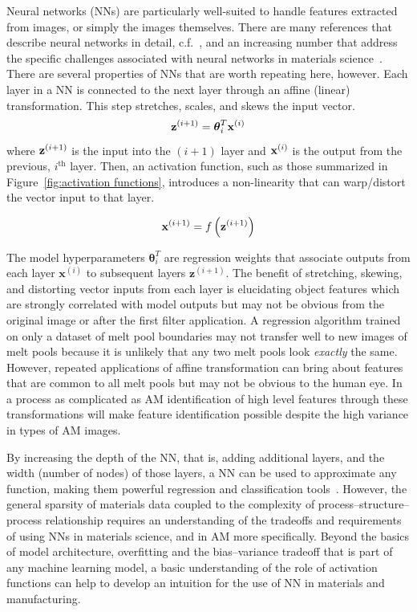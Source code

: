 Neural networks (NNs) are particularly well-suited to handle features extracted from images, or simply the images themselves. There are many references that describe neural networks in detail, c.f.~\cite{Hastie2009}, and an increasing number that address the specific challenges associated with neural networks in materials science~\cite{Bhadeshia2009}. There are several properties of NNs that are worth repeating here, however. Each layer in a NN is connected to the next layer through an affine (linear) transformation. This step stretches, scales, and skews the input vector.
\begin{equation}
	{\bold z}^{(i+1)} = \boldsymbol \theta_i^T {\bold x}^{(i)}
\end{equation}
where ${\bold z}^{(i+1)}$ is the input into the $(i+1)$ layer and ${\bold x}^{(i)}$ is the output from the previous, $i^\textrm{th}$ layer. Then, an activation function, such as those summarized in Figure~\ref{fig:activation functions}, introduces a non-linearity that can warp/distort the vector input to that layer. 

\begin{equation}
	{\bold x}^{(i+1)} = f \left( {\bold z}^{(i+1)} \right)
\end{equation}

The model hyperparameters $\mathbf{\theta}_i^T$ are regression weights that associate outputs from each layer $\mathbf{x}^{(i)}$ to subsequent layers $\mathbf{z}^{(i + 1)}$. The benefit of stretching, skewing, and distorting vector inputs from each layer is elucidating object features which are strongly correlated with model outputs but may not be obvious from the original image or after the first filter application. A regression algorithm trained on only a dataset of melt pool boundaries may not transfer well to new images of melt pools because it is unlikely that any two melt pools look \textit{exactly} the same. However, repeated applications of affine transformation can bring about features that are common to all melt pools but may not be obvious to the human eye. In a process as complicated as AM identification of high level features through these transformations will make feature identification possible despite the high variance in types of AM images.

By increasing the depth of the NN, that is, adding additional layers, and the width (number of nodes) of those layers, a NN can be used to approximate any function, making them powerful regression and classification tools~\cite{Hornik1989}. However, the general sparsity of materials data coupled to the complexity of process--structure--process relationship requires an understanding of the tradeoffs and requirements of using NNs in materials science, and in AM more specifically. Beyond the basics of model architecture, overfitting and the bias--variance tradeoff that is part of any machine learning model, a basic understanding of the role of activation functions can help to develop an intuition for the use of NN in materials and manufacturing.

